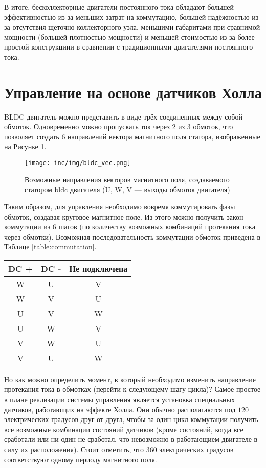В итоге, бесколлекторные двигатели постоянного тока обладают большей эффективностью из-за меньших затрат на коммутацию, большей надёжностью из-за отсутствия щеточно-коллекторного узла, меньшими габаритами при сравнимой мощности (большей плотностью мощности) и меньшей стоимостью из-за более простой конструкциии в сравнении с традиционными двигателями постоянного тока.

\section{Управление на основе датчиков Холла}
\label{sec:hall}
BLDC двигатель можно представить в виде трёх соединенных между собой обмоток. Одновременно можно пропускать ток через 2 из 3 обмоток, что позволяет создать 6 направлений вектора магнитного поля статора, изображенные на Рисунке \ref{img:mag_field}.

\begin{figure}[!h]
\centering
\texttt{[image: inc/img/bldc\_vec.png]}
\caption{Возможные направления векторов магнитного поля, создаваемого статором bldc двигателя (U, W, V --- выходы обмоток двигателя) \cite{habr:bldc_control}}
\label{img:mag_field}
\end{figure}

Таким образом, для управления необходимо вовремя коммутировать фазы обмоток, создавая круговое магнитное поле. Из этого можно получить закон коммутации из 6 шагов (по количеству возможных комбинаций протекания тока через обмотки). Возможная последовательность коммутации обмоток приведена в Таблице \ref{table:commutation}.

\begin{center}
\begin{tabular}{|c|c|c|}
 \hline
 DC + & DC - & Не подключена \\
 \hline
 W & U & V \\ 
 \hline
 W & V & U \\
 \hline
 U & V & W \\
 \hline
 U & W & V \\
 \hline
 V & W & U \\
 \hline
 V & U & W \\
 \hline
\end{tabular}
\end{center}

Но как можно определить момент, в который необходимо изменить направление протекания тока в обмотках (перейти к следующему шагу цикла)? Самое простое в плане реализации системы управления является установка специальных датчиков, работающих на эффекте Холла. Они обычно располагаются под $120$ электрических градусов друг от друга, чтобы за один цикл коммутации получить все возможные комбинации состояний датчиков (кроме состояний, когда все сработали или ни один не сработал, что невозможно в работающием двигателе в силу их расположения). Стоит отметить, что $360$ электрических градусов соответствуют одному периоду магнитного поля.

